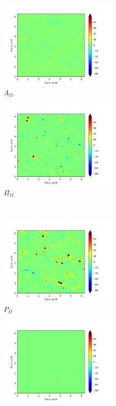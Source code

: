 \begin{figure}[H]
\begin{subfigure}{0.45\textwidth}
        \includegraphics[height=1.75in]{media/run-cds-65/A-enst-1330.png}
        \caption{$A_{\Omega}$}
    \end{subfigure}
    \newline
    \begin{subfigure}{0.45\textwidth}
        \includegraphics[height=1.75in]{media/run-cds-65/Pi-enst-1330.png}
        \caption{$\Pi_{\Omega}$}
    \end{subfigure}
    ~
    \begin{subfigure}{0.45\textwidth}
        \includegraphics[height=1.75in]{media/run-cds-65/P-enst-1330.png}
        \caption{$P_{\Omega}$}
    \end{subfigure}
    \newline
    \begin{subfigure}{0.45\textwidth}
        \includegraphics[height=1.75in]{media/run-cds-65/B-enst-1330.png}

\end{subfigure}
\end{figure}

